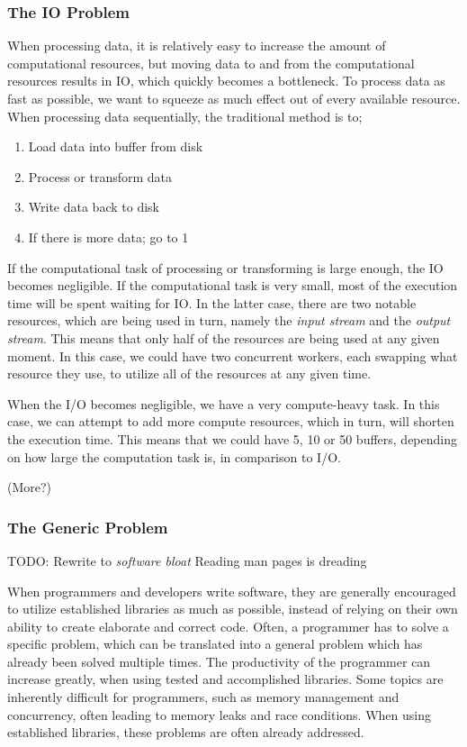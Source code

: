 \documentclass[a4paper]{article}
\begin{document}
\subsubsection{The IO Problem}
When processing data, it is relatively easy to increase the amount of computational resources, but moving
data to and from the computational resources results in IO, which quickly becomes a bottleneck. To process
data as fast as possible, we want to squeeze as much effect out of every available resource. When
processing data sequentially, the traditional method is to;

\begin{enumerate}
\item Load data into buffer from disk
\item Process or transform data
\item Write data back to disk
\item If there is more data; go to 1
\end{enumerate}

If the computational task of processing or transforming is large enough, the IO becomes negligible. If the
computational task is very small, most of the execution time will be spent waiting for IO. In the latter case,
there are two notable resources, which are being used in turn, namely the \textit{input stream} and the
\textit{output stream}. This means that only half of the resources are being used at any given moment. In this
case, we could have two concurrent workers, each swapping what resource they use, to utilize all of the resources
at any given time.

When the I/O becomes negligible, we have a very compute-heavy task. In this case, we can attempt to add more
compute resources, which in turn, will shorten the execution time. This means that we could have 5, 10 or 50
buffers, depending on how large the computation task is, in comparison to I/O.

(More?)


\subsubsection{The Generic Problem}
TODO: Rewrite to \textit{software bloat} Reading man pages is dreading

When programmers and developers write software, they are generally encouraged to utilize established
libraries as much as possible, instead of relying on their own ability to create elaborate and correct
code. Often, a programmer has to solve a specific problem, which can be translated into a general problem
which has already been solved multiple times. The productivity of the programmer can increase greatly,
when using tested and accomplished libraries. Some topics are inherently difficult for programmers, such
as memory management and concurrency, often leading to memory leaks and race conditions. When using
established libraries, these problems are often already addressed.
\end{document}
